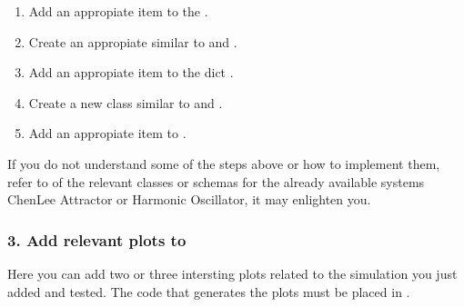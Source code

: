 \documentclass[a4paper,landscape,10pt,english]{sphinxmanual}
\begin{document}
\begin{enumerate}
\item {} 
Add an appropiate item to the 
{\hyperref[\detokenize{code_docs/simulation_api.controller:simulation_api.controller.schemas.SimSystem_to_SimParams}]{}}.

\item {} 
Create an appropiate  similar to
{\hyperref[\detokenize{code_docs/simulation_api.controller:simulation_api.controller.schemas.params_mapping_HO}]{}} and
{\hyperref[\detokenize{code_docs/simulation_api.controller:simulation_api.controller.schemas.params_mapping_ChenLee}]{}}.

\item {} 
Add an appropiate item to the dict
{\hyperref[\detokenize{code_docs/simulation_api.controller:simulation_api.controller.schemas.system_to_params_dict}]{}}.

\item {} 
Create a new class similar to
{\hyperref[\detokenize{code_docs/simulation_api.controller:simulation_api.controller.schemas.PlotQueryValues_HO}]{}} and
{\hyperref[\detokenize{code_docs/simulation_api.controller:simulation_api.controller.schemas.PlotQueryValues_ChenLee}]{}}.

\item {} 
Add an appropiate item to {\hyperref[\detokenize{code_docs/simulation_api.controller:simulation_api.controller.schemas.PlotQueryValues}]{}}.

\end{enumerate}

If you do not understand some of the steps above or how to implement them, refer
to {\hyperref[\detokenize{code_docs/simulation_api:code-api-package}]{}} of the relevant classes or schemas
for the already available systems \textendash{}Chen\sphinxhyphen{}Lee Attractor or Harmonic Oscillator\textendash{},
it may enlighten you.


\subsubsection{3. Add relevant plots to }
\label{\detokenize{code_docs/new_simulation:add-relevant-plots-to-plot-solution}}
Here you can add two or three intersting plots related to the simulation you
just added and tested. The code that generates the plots must be placed in
{\hyperref[\detokenize{code_docs/simulation_api.controller:simulation_api.controller.tasks._plot_solution}]{}}.
\end{document}

